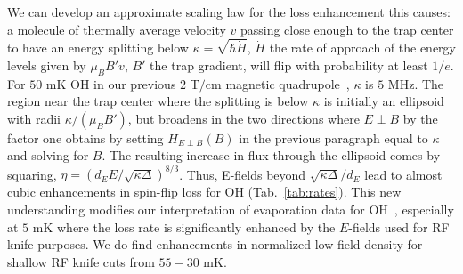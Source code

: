 \documentclass[%
 reprint,
 amsmath,amssymb,
 aps,
prl,
]{revtex4-1}
\newcommand{\epb}{{$E\!\perp\!B$}}
\newcommand{\epbm}{{E\!\perp\!B}}
\begin{document}
We can develop an approximate scaling law for the loss enhancement this causes: a molecule of thermally average velocity $v$ passing close enough to the trap center to have an energy splitting below $\kappa=\sqrt{\hbar \dot{H}}$, $\dot{H}$ the rate of approach of the energy levels given by $\mu_BB'v$, $B'$ the trap gradient, will flip with probability at least $1/e$. For $50\text{ mK}$ OH in our previous $2\text{ T/cm}$ magnetic quadrupole~\cite{Sawyer2008},  $\kappa$ is $5\text{ MHz}$. The region near the trap center where the splitting is below $\kappa$ is initially an ellipsoid with radii $\kappa/(\mu_BB')$, but broadens in the two directions where \epb{} by the factor one obtains by setting $H_\epbm(B)$ in the previous paragraph equal to $\kappa$ and solving for $B$. The resulting increase in flux through the ellipsoid comes by squaring, $\eta = (d_EE/\sqrt{\kappa\Delta})^{8/3}$. Thus, E-fields beyond $\sqrt{\kappa\Delta}/d_E$ lead to almost cubic enhancements in spin-flip loss for OH (Tab.~\ref{tab:rates}). This new understanding modifies our interpretation of evaporation data for OH~\cite{Stuhl2012evap}, especially at $5\text{ mK}$ where the loss rate is significantly enhanced by the $E$-fields used for RF knife purposes. We do find enhancements in normalized low-field density for shallow RF knife cuts from $55-30\text{ mK}$.
\end{document}
